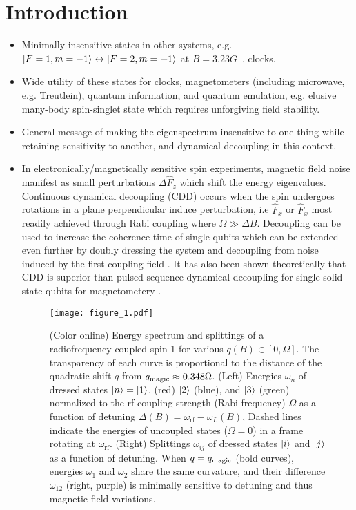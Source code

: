 \documentclass[aps,prl,reprint,superscriptaddress,floatfix]{revtex4-1}
\begin{document}
\section{Introduction}
\label{sec:introduction}
\begin{itemize}
    \item Minimally insensitive states in other systems, e.g. $\vert F=1,m=-1 \rangle  \leftrightarrow \vert F=2,m=+1 \rangle $ at $B=3.23\unit{G}$~\cite{matthews_dynamical_1998}, clocks.
    \item Wide utility of these states for clocks, magnetometers (including microwave, e.g. Treutlein), quantum information, and quantum emulation, e.g. elusive many-body spin-singlet state which requires unforgiving field stability.
    \item General message of making the eigenspectrum insensitive to one thing while retaining sensitivity to another, and dynamical decoupling in this context.
    \item In electronically/magnetically sensitive spin experiments, magnetic field noise manifest as small perturbations $\Delta \hat{F}_{z}$ which shift the energy eigenvalues.
    Continuous dynamical decoupling (CDD) occurs when the spin undergoes rotations in a plane perpendicular induce perturbation, i.e $\hat{F}_{x}$ or $\hat{F}_{x}$ most readily achieved through Rabi coupling where $\Omega \gg \Delta B$.
    Decoupling can be used to increase the coherence time of single qubits \cite{golter_protecting_2014} which can be extended even further by doubly dressing the system and decoupling from noise induced by the first coupling field \cite{cai_robust_2012}.
    It has also been shown theoretically that CDD is superior than pulsed sequence dynamical decoupling for single solid-state qubits for magnetometery \cite{hirose_continuous_2012}.
\begin{figure}
    \centering
    \texttt{[image: figure\_1.pdf]}
    \caption{
    \label{fig:eigensystem_schematic}
        (Color online)
        Energy spectrum and splittings of a radiofrequency coupled spin-1 for various $q(B)\in[0,\Omega]$.
        The transparency of each curve is proportional to the distance of the quadratic shift $q$ from $q_{\text{magic}}\approx 0.348\Omega$.
        (Left) Energies $\omega_n$ of dressed states $\vert n \rangle =\vert 1 \rangle $, (red) $\vert 2 \rangle $ (blue), and $\vert 3 \rangle $ (green) normalized to the rf-coupling strength (Rabi frequency) $\Omega$ as a function of detuning $\Delta(B)=\omega_{\text{rf}}-\omega_L(B)$,
        Dashed lines indicate the energies of uncoupled states ($\Omega=0$) in a frame rotating at $\omega_{\text{rf}}$.
        (Right) Splittings $\omega_{ij}$ of dressed states $\vert i \rangle $ and $\vert j \rangle $ as a function of detuning.
        When $q=q_{\text{magic}}$ (bold curves), energies $\omega_1$ and $\omega_2$ share the same curvature, and their difference $\omega_{12}$ (right, purple) is minimally sensitive to detuning and thus magnetic field variations. 
    }
\end{figure}


\end{itemize}
\end{document}
